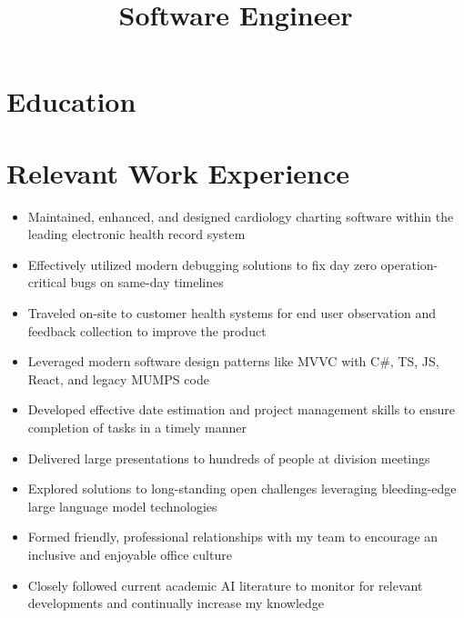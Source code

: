 \documentclass[10pt,a4paper,sans]{moderncv}
\title{Software Engineer}
\begin{document}
\makecvtitle

\section{Education}

\section{Relevant Work Experience}
\begin{itemize}
\item Maintained, enhanced, and designed cardiology charting software within the leading electronic health record system
\item Effectively utilized modern debugging solutions to fix day zero operation-critical bugs on same-day timelines
\item Traveled on-site to customer health systems for end user observation and feedback collection to improve the product
\item Leveraged modern software design patterns like MVVC with C\#, TS, JS, React, and legacy MUMPS code
\item Developed effective date estimation and project management skills to ensure completion of tasks in a timely manner
\item Delivered large presentations to hundreds of people at division meetings
\item Explored solutions to long-standing open challenges leveraging bleeding-edge large language model technologies
\item Formed friendly, professional relationships with my team to encourage an inclusive and enjoyable office culture
\item Closely followed current academic AI literature to monitor for relevant developments and continually increase my knowledge
\end{itemize}
\end{document}
